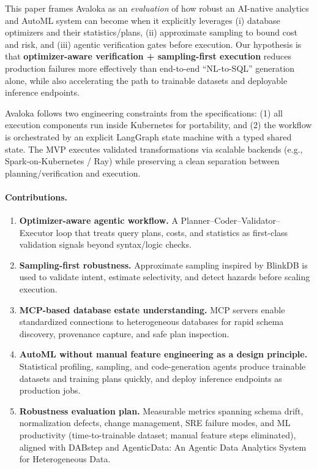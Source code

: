 \documentclass{article} %
\begin{document}
This paper frames Avaloka as an \emph{ evaluation} of how robust an AI-native analytics and AutoML
system can become when it explicitly leverages (i) database optimizers and their statistics/plans,
(ii) approximate sampling to bound cost and risk, and (iii) agentic verification gates before
execution. Our hypothesis is that \textbf{optimizer-aware verification + sampling-first execution}
reduces production failures more effectively than end-to-end ``NL-to-SQL'' generation alone, while
also accelerating the path to trainable datasets and deployable inference endpoints.

Avaloka follows two engineering constraints from the specifications: (1) all execution components
run inside Kubernetes for portability, and (2) the workflow is orchestrated by an explicit LangGraph
state machine with a typed shared state. The MVP executes
validated transformations via scalable backends (e.g., Spark-on-Kubernetes / Ray) while preserving a
clean separation between planning/verification and execution.

\paragraph{Contributions.}
\begin{enumerate}
  \item \textbf{Optimizer-aware agentic workflow.} A Planner--Coder--Validator--Executor loop that treats
  query plans, costs, and statistics as first-class validation signals beyond syntax/logic checks.
  \item \textbf{Sampling-first robustness.} Approximate sampling inspired by BlinkDB is used to validate
  intent, estimate selectivity, and detect hazards before scaling execution.
  \item \textbf{MCP-based database estate understanding.} MCP servers enable standardized connections to
  heterogeneous databases for rapid schema discovery, provenance capture, and safe plan inspection.
  \item \textbf{AutoML without manual feature engineering as a design principle.} Statistical profiling,
  sampling, and code-generation agents produce trainable datasets and training plans quickly, and deploy
  inference endpoints as production jobs.
  \item \textbf{Robustness evaluation plan.} Measurable metrics spanning schema drift, normalization defects,
  change management, SRE failure modes, and ML productivity (time-to-trainable dataset; manual feature steps
  eliminated), aligned with DABstep and AgenticData: An Agentic Data Analytics System for Heterogeneous Data.
\end{enumerate}
\end{document}
